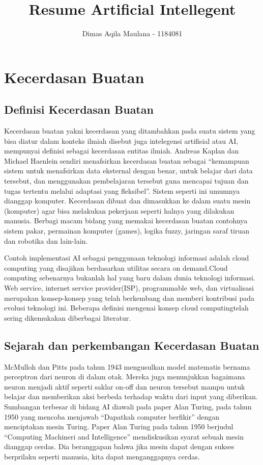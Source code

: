 \documentclass{article}
\title{Resume Artificial Intellegent}
\author{Dimas Aqila Maulana - 1184081}
\begin{document}
\maketitle
\section{Kecerdasan Buatan}
\subsection{Definisi Kecerdasan Buatan}
 \hspace{1cm} Kecerdasan buatan yakni kecerdasan yang ditambahkan pada suatu sistem yang bisa diatur dalam konteks ilmiah disebut juga  intelegensi artifisial atau AI, mempunyai definisi sebagai kecerdasan entitas ilmiah. Andreas Kaplan dan Michael Haenlein sendiri menafsirkan kecerdasan buatan sebagai “kemampuan sistem untuk menafsirkan data eksternal dengan benar, untuk belajar dari data tersebut, dan menggunakan pembelajaran tersebut guna mencapai tujuan dan tugas tertentu melalui adaptasi yang fleksibel”. Sistem seperti ini umumnya dianggap komputer. Kecerdasan dibuat dan dimasukkan ke dalam suatu mesin (komputer) agar bisa melakukan pekerjaan seperti halnya yang dilakukan manusia. Berbagi macam bidang yang memakai kecerdasan buatan contohnya sistem pakar, permainan komputer (games), logika fuzzy, jaringan saraf tiruan dan robotika dan lain-lain.
 
\hspace{1cm}Contoh  implementasi  AI  sebagai  penggunaan teknologi informasi adalah cloud computing yang disajikan berdasarkan utilitas secara on demand.Cloud computing sebenarnya  bukanlah  hal  yang  baru  dalam dunia   teknologi informasi. Web   service, internet service provider(ISP), programmable web,   dan virtualisasi   merupakan   konsep-konsep   yang   telah berkembang   dan   memberi   kontribusi   pada   evolusi teknologi ini. Beberapa definisi mengenai konsep cloud computingtelah   sering   dikemukakan   diberbagai literatur.

\subsection{Sejarah dan perkembangan Kecerdasan Buatan}
\hspace{1cm} McMulloh dan Pitts pada tahun 1943 mengusulkan model matematis bernama perceptron dari neuron di dalam  otak.  Mereka juga menunjukkan  bagaimana neuron menjadi aktif seperti saklar on-off dan neuron tersebut mampu untuk belajar dan memberikan aksi berbeda terhadap waktu dari input yang diberikan.  Sumbangan terbesar di bidang AI diawali pada paper Alan Turing, pada tahun 1950 yang mencoba menjawab  “Dapatkah computer berfikir” dengan menciptakan mesin Turing.  Paper Alan Turing pada tahun 1950 berjudul “Computing Machineri and Intelligence” mendiskusikan syarat sebuah mesin dianggap cerdas. Dia beranggapan bahwa jika mesin dapat dengan sukses berprilaku seperti manusia, kita dapat menganggapnya cerdas.
\end{document}
